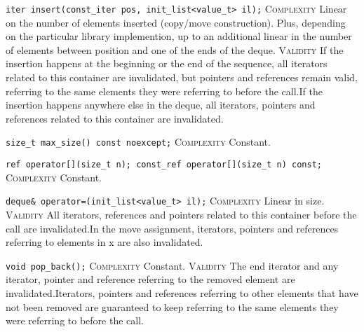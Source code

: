 \noindent{}\hspace*{0.25em}\lstinline[basicstyle=\ttfamily\color{corange}]{iter insert(const_iter pos, init_list<value_t> il);} \textsc{Complexity} Linear on the number of elements inserted (copy/move construction). Plus, depending on the particular library implemention, up to an additional linear in the number of elements between position and one of the ends of the deque. \textsc{Validity} If the insertion happens at the beginning or the end of the sequence, all iterators related to this container are invalidated, but pointers and references remain valid, referring to the same elements they were referring to before the call.If the insertion happens anywhere else in the deque, all iterators, pointers and references related to this container are invalidated.\\\vspace{-0.6em}

\noindent{}\hspace*{0.25em}\lstinline[basicstyle=\ttfamily\color{cgreen}]{size_t max_size() const noexcept;} \textsc{Complexity} Constant.\\\vspace{-0.6em}

\noindent{}\hspace*{0.25em}\lstinline[basicstyle=\ttfamily\color{cgreen}]{ref operator[](size_t n); const_ref operator[](size_t n) const;} \textsc{Complexity} Constant.\\\vspace{-0.6em}

\noindent{}\hspace*{0.25em}\lstinline[basicstyle=\ttfamily\color{corange}]{deque& operator=(init_list<value_t> il);} \textsc{Complexity} Linear in size. \textsc{Validity} All iterators, references and pointers related to this container before the call are invalidated.In the move assignment, iterators, pointers and references referring to elements in x are also invalidated.\\\vspace{-0.6em}

\noindent{}\hspace*{0.25em}\lstinline[basicstyle=\ttfamily\color{cgreen}]{void pop_back();} \textsc{Complexity} Constant. \textsc{Validity} The end iterator and any iterator, pointer and reference referring to the removed element are invalidated.Iterators, pointers and references referring to other elements that have not been removed are guaranteed to keep referring to the same elements they were referring to before the call.\\\vspace{-0.6em}

